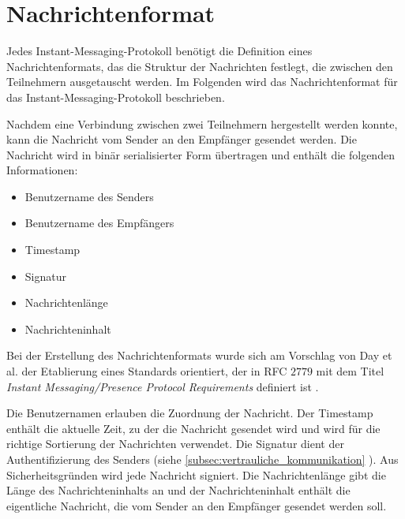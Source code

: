 \section{Nachrichtenformat}
\label{sec:nachrichtenformat}

Jedes Instant-Messaging-Protokoll benötigt die Definition eines Nachrichtenformats, das die Struktur der Nachrichten festlegt, die zwischen den Teilnehmern ausgetauscht werden. Im Folgenden wird das Nachrichtenformat für das Instant-Messaging-Protokoll beschrieben.

Nachdem eine Verbindung zwischen zwei Teilnehmern hergestellt werden konnte, kann die Nachricht vom Sender an den Empfänger gesendet werden. Die Nachricht wird in binär serialisierter Form übertragen und enthält die folgenden Informationen:

\begin{itemize}
    \item Benutzername des Senders
    \item Benutzername des Empfängers
    \item Timestamp
    \item Signatur
    \item Nachrichtenlänge
    \item Nachrichteninhalt
\end{itemize}

\noindent Bei der Erstellung des Nachrichtenformats wurde sich am Vorschlag von Day et al. der Etablierung eines Standards orientiert, der in RFC $2779$ mit dem Titel \textit{Instant Messaging/Presence Protocol Requirements} definiert ist \Parencite[S. 9]{rfc2779_IMPP}. 

Die Benutzernamen erlauben die Zuordnung der Nachricht. Der Timestamp enthält die aktuelle Zeit, zu der die Nachricht gesendet wird und wird für die richtige Sortierung der Nachrichten verwendet. Die Signatur dient der Authentifizierung des Senders (siehe \ref{subsec:vertrauliche_kommunikation} \textit{}). Aus Sicherheitsgründen wird jede Nachricht signiert. Die Nachrichtenlänge gibt die Länge des Nachrichteninhalts an und der Nachrichteninhalt enthält die eigentliche Nachricht, die vom Sender an den Empfänger gesendet werden soll.
